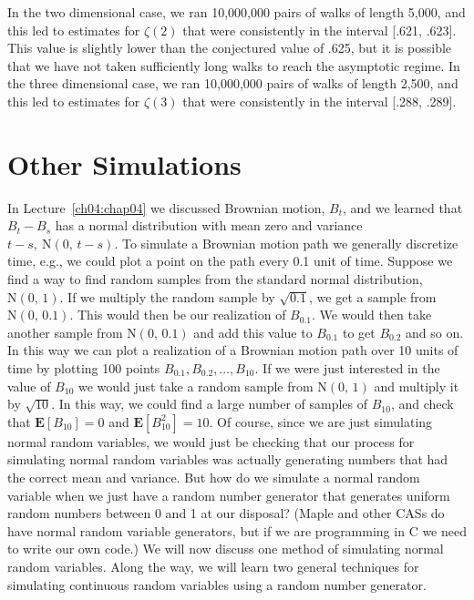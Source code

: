 \documentclass{stml-l}
\theoremstyle{definition}
\numberwithin{equation}{chapter}
\numberwithin{figure}{chapter}
\numberwithin{figure}{section}
\begin{document}
In the two dimensional case, we ran 10,000,000 pairs of walks of
length 5,000, and this led to estimates for $\zeta(2)$ that were
consistently in the interval [.621, .623]. This value is slightly
lower than the conjectured value of .625, but it is possible that we
have not taken sufficiently long walks to reach the asymptotic
regime. In the three dimensional case, we ran 10,000,000 pairs of
walks of length 2,500, and this led to estimates for $\zeta(3)$ that
were consistently in the interval [.288, .289].


\chapter{Other Simulations\label{ch12:chap12}}

In Lecture~\ref{ch04:chap04} we discussed Brownian motion, $B_{t}$,
and we learned that $B_{t}-B_{s}$ has a normal distribution with
mean zero and variance $t-s,\ \mathrm{N}(0,\,t-s)$. To simulate a
Brownian motion path we generally discretize time, e.g., we could
plot a point on the path every 0.1 unit of time. Suppose we find a
way to find random samples from the standard normal distribution,
$\mathrm{N}(0,\,1)$. If we multiply the random sample by
$\sqrt{0.1}$, we get a sample from $\mathrm{N}(0,\,0.1)$. This
would then be our realization of $B_{0.1}$. We would then take
another sample from $\mathrm{N}(0,\,0.1)$ and add this value to
$B_{0.1}$ to get $B_{0.2}$ and so on. In this way we can plot a
realization of a Brownian motion path over 10 units of time by
plotting 100 points $B_{0.1},B_{0.2},\ldots,B_{10}$. If we were just
interested in the value of $B_{10}$ we would just take a random
sample from $\mathrm{N}(0,\,1)$ and multiply it by $\sqrt{10}$. In
this way, we could find a large number of samples of $B_{10}$, and
check that $\mathbf{E}[B_{10}]=0$ and $\mathbf{E}[B_{10}^{2}]=10$.
Of course, since we are just simulating normal random variables, we
would just be checking that our process for simulating normal random
variables was actually generating numbers that had the correct mean
and variance. But how do we simulate a normal random variable when
we just have a random number generator that generates uniform random
numbers between $0$ and 1 at our disposal? (Maple and other CASs do
have normal random variable generators, but if we are programming in
$\mathrm{C}$ we need to write our own code.) We will now discuss one
method of simulating normal random variables. Along the way, we will
learn two general techniques for simulating continuous random
variables using a random number generator.
\end{document}
